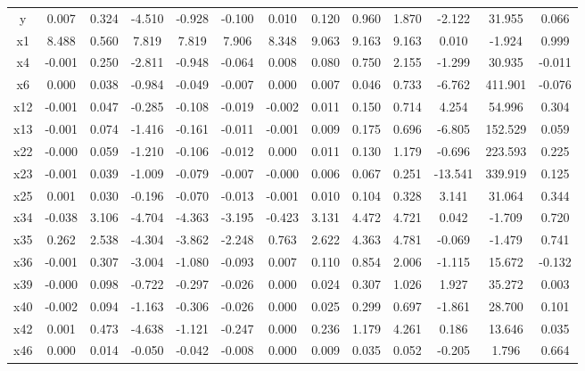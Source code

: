 {\begin{longtable}{@{\extracolsep\fill} ccccccccccccc}
\bottomrule
\endlastfoot
       y &  0.007 & 0.324 & -4.510 & -0.928 & -0.100 &  0.010 &  0.120 & 0.960 & 1.870 &    -2.122 &    31.955 &  0.066 \\
      x1 &  8.488 & 0.560 &  7.819 &  7.819 &  7.906 &  8.348 &  9.063 & 9.163 & 9.163 &     0.010 &    -1.924 &  0.999 \\
      x4 & -0.001 & 0.250 & -2.811 & -0.948 & -0.064 &  0.008 &  0.080 & 0.750 & 2.155 &    -1.299 &    30.935 & -0.011 \\
      x6 &  0.000 & 0.038 & -0.984 & -0.049 & -0.007 &  0.000 &  0.007 & 0.046 & 0.733 &    -6.762 &   411.901 & -0.076 \\
     x12 & -0.001 & 0.047 & -0.285 & -0.108 & -0.019 & -0.002 &  0.011 & 0.150 & 0.714 &     4.254 &    54.996 &  0.304 \\
     x13 & -0.001 & 0.074 & -1.416 & -0.161 & -0.011 & -0.001 &  0.009 & 0.175 & 0.696 &    -6.805 &   152.529 &  0.059 \\
     x22 & -0.000 & 0.059 & -1.210 & -0.106 & -0.012 &  0.000 &  0.011 & 0.130 & 1.179 &    -0.696 &   223.593 &  0.225 \\
     x23 & -0.001 & 0.039 & -1.009 & -0.079 & -0.007 & -0.000 &  0.006 & 0.067 & 0.251 &   -13.541 &   339.919 &  0.125 \\
     x25 &  0.001 & 0.030 & -0.196 & -0.070 & -0.013 & -0.001 &  0.010 & 0.104 & 0.328 &     3.141 &    31.064 &  0.344 \\
     x34 & -0.038 & 3.106 & -4.704 & -4.363 & -3.195 & -0.423 &  3.131 & 4.472 & 4.721 &     0.042 &    -1.709 &  0.720 \\
     x35 &  0.262 & 2.538 & -4.304 & -3.862 & -2.248 &  0.763 &  2.622 & 4.363 & 4.781 &    -0.069 &    -1.479 &  0.741 \\
     x36 & -0.001 & 0.307 & -3.004 & -1.080 & -0.093 &  0.007 &  0.110 & 0.854 & 2.006 &    -1.115 &    15.672 & -0.132 \\
     x39 & -0.000 & 0.098 & -0.722 & -0.297 & -0.026 &  0.000 &  0.024 & 0.307 & 1.026 &     1.927 &    35.272 &  0.003 \\
     x40 & -0.002 & 0.094 & -1.163 & -0.306 & -0.026 &  0.000 &  0.025 & 0.299 & 0.697 &    -1.861 &    28.700 &  0.101 \\
     x42 &  0.001 & 0.473 & -4.638 & -1.121 & -0.247 &  0.000 &  0.236 & 1.179 & 4.261 &     0.186 &    13.646 &  0.035 \\
     x46 &  0.000 & 0.014 & -0.050 & -0.042 & -0.008 &  0.000 &  0.009 & 0.035 & 0.052 &    -0.205 &     1.796 &  0.664 \\

\end{longtable}}
